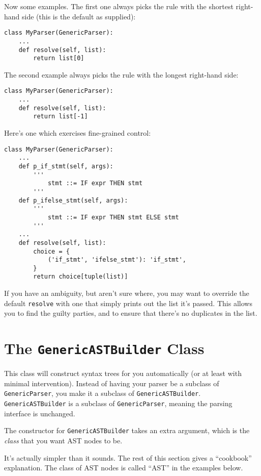 \documentclass{article}
\newcommand{\code}[1]{\texttt{#1}}
\begin{document}
Now some examples.  The first one always picks the rule with the shortest
right-hand side (this is the default as supplied):

\begin{verbatim}
class MyParser(GenericParser):
    ...
    def resolve(self, list):
        return list[0]
\end{verbatim}

The second example always picks the rule with the longest
right-hand side:

\begin{verbatim}
class MyParser(GenericParser):
    ...
    def resolve(self, list):
        return list[-1]
\end{verbatim}

Here's one which exercises fine-grained control:

\begin{verbatim}
class MyParser(GenericParser):
    ...
    def p_if_stmt(self, args):
        '''
            stmt ::= IF expr THEN stmt
        '''
    def p_ifelse_stmt(self, args):
        '''
            stmt ::= IF expr THEN stmt ELSE stmt
        '''
    ...
    def resolve(self, list):
        choice = {
            ('if_stmt', 'ifelse_stmt'): 'if_stmt',
        }
        return choice[tuple(list)]
\end{verbatim}

If you have an ambiguity, but aren't sure where, you may want to override
the default \code{resolve} with one that simply prints out the list it's
passed.  This allows you to find the guilty parties, and to ensure that there's
no duplicates in the list.

\section{The \code{GenericASTBuilder} Class}

This class will construct syntax trees for you automatically (or at
least with minimal intervention).  Instead of having your parser be a
subclass of \code{GenericParser}, you make it a subclass of
\code{GenericASTBuilder}.  \code{GenericASTBuilder} is a subclass of
\code{GenericParser}, meaning the parsing interface is unchanged.

The constructor for \code{GenericASTBuilder} takes an extra argument,
which is the \emph{class} that you want AST nodes to be.

It's actually simpler than it sounds.  The rest of this section gives
a ``cookbook'' explanation.  The class of AST nodes is called ``AST''
in the examples below.
\end{document}
